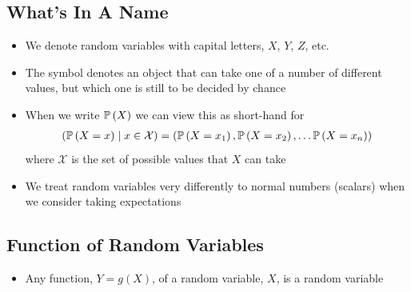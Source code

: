 
\begin{slide}
\section{What's In A Name}

\begin{PauseHighLight}
  \begin{itemize}
  \item We denote random variables with capital letters, $X$,
    $Y$, $Z$, etc.\pause
  \item The symbol denotes an object that can take one of a number of
    different values, but which one is still to be decided by
    chance\pause
  \item When we write $\mathbb{P}\left( X \right)$ we can view this as short-hand for
    \begin{align*}
      \left( \mathbb{P}\left( X=x \right) \mid x \in \mathcal{X} \right)
      = \left( \mathbb{P}\left( X=x_1 \right), \mathbb{P}\left( X=x_2 \right),\ldots\mathbb{P}\left( X=x_n \right) \right)
    \end{align*}
    where $\mathcal{X}$ is the set of possible values that $X$
    can take\pause
  \item We treat random variables very differently to normal numbers
    (scalars) when we consider taking expectations\pause
  \end{itemize}
\end{PauseHighLight}

\end{slide}



\begin{slide}
\section[-1]{Function of Random Variables}

\pb
\begin{itemize}
\item Any function, $Y=g(X)$, of a random variable, $X$, is a random
  variable\pause
\end{itemize}
\begin{center}
  \pause
\end{center}
\end{slide}



